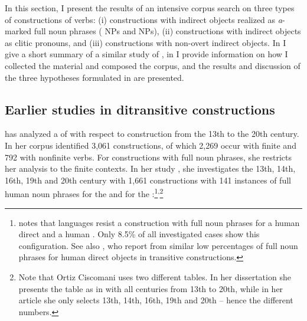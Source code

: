 \documentclass[output=paper]{LSP/langsci}
\begin{document}
In this section, I present the results of an intensive corpus search on three types of constructions of  verbs: (i) constructions with indirect objects realized as \textit{a}-marked full noun phrases ( NPs and  NPs), (ii) constructions with indirect objects as clitic pronouns, and (iii) constructions with non-overt indirect objects. In  I give a short summary of a similar study of \citet{Ortiz2005Objetos,Ortiz2011Construcciones}, in  I provide information on how I collected the material and composed the corpus, and  the results and discussion of the three hypotheses formulated in  are presented.


\subsection{Earlier studies in ditransitive constructions} %
\label{11-subsec:4-1}

\citet{Ortiz2005Objetos,Ortiz2011Construcciones} has analyzed a  of  with respect to  construction from the 13th to the 20th century. In her corpus  \citet[20]{Ortiz2011Construcciones} identified 3,061  constructions, of which 2,269 occur with finite and 792 with nonfinite verbs. For  constructions with full noun phrases, she restricts her analysis to the finite contexts. In her study \citep{Ortiz2005Objetos}, she investigates the 13th, 14th, 16th, 19th and 20th century with 1,661  constructions with 141 instances of full human noun phrases for the  and for the :\footnote{\citet[162]{Ortiz2011Construcciones} notes that languages resist a construction with full noun phrases for a human direct and a human . Only 8.5\% of all investigated cases show this configuration. See also \citet{vonHeusingeretal2011Affectedness}, who report from similar low percentages of full noun phrases for human direct objects in transitive constructions.}\textsuperscript{,}\footnote{Note that Ortiz Ciscomani uses two different tables. In her dissertation \citep{Ortiz2011Construcciones} she presents the table as in  with all centuries from 13th to 20th, while in her article \citep{Ortiz2005Objetos} she only selects 13th, 14th, 16th, 19th and 20th – hence the different numbers.}
\end{document}

